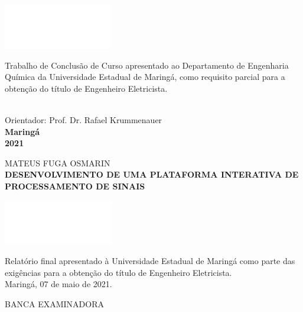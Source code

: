 \documentclass[12pt,a4paper]{report}
\begin{document}
\begin{minipage}{0.49\linewidth}
  \includegraphics[scale=0.01]{images/branco} 
\end{minipage}
\begin{minipage}{0.5\linewidth}
{
  \justifying 
  Trabalho de Conclusão de Curso apresentado ao Departamento de Engenharia Química da Universidade Estadual de
  Maringá, como requisito parcial para a obtenção do título de Engenheiro Eletricista.
}\\
\end{minipage}\\[2.978cm]

{
  \center
  Orientador: Prof. Dr. Rafael Krummenauer\\[2.978cm]

  {
    \bf
    Maringá\\
    2021
  }
}

\thispagestyle{empty}
\clearpage

\center

MATEUS FUGA OSMARIN\\[1.86cm]

\textbf{DESENVOLVIMENTO DE UMA PLATAFORMA INTERATIVA DE PROCESSAMENTO DE SINAIS}\\[1.86cm]


\begin{minipage}{0.49\linewidth}
\includegraphics[scale=0.01]{images/branco} 
\end{minipage}
\begin{minipage}{0.5\linewidth}
  {
    \justifying 
    Relatório final apresentado à Universidade Estadual de Maringá como parte das exigências para a obtenção do
    título de Engenheiro Eletricista.
  }\\[1.86cm]

  Maringá, 07 de maio de 2021.\\[1.86cm]
\end{minipage}

{
  \center BANCA EXAMINADORA\\[2.41cm]
}
\end{document}
